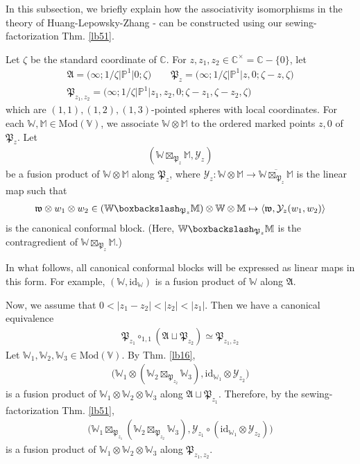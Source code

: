 \documentclass[11pt,b5paper,notitlepage]{article}
\theoremstyle{definition}
\theoremstyle{plain}
\newcommand{\fk}{\mathfrak}
\newcommand{\mc}{\mathcal}
\newcommand{\ovl}{\overline}
\newcommand{\Vbb}{\mathbb V}
\newcommand{\Wbb}{\mathbb W}
\newcommand{\Mbb}{\mathbb M}
\newcommand{\Cbb}{\mathbb C}
\newcommand{\Pbb}{\mathbb P}
\newcommand{\<}{\left\langle}
\renewcommand{\>}{\right\rangle}
\newcommand{\bk}[1]{\langle {#1}\rangle}
\newcommand{\bbs}{\boxbackslash}
\newcommand{\Mod}{\mathrm{Mod}}
\newcommand{\id}{\mathrm{id}}
\newcommand{\fp}{\mathfrak{P}}
\numberwithin{equation}{section}
\begin{document}
In this subsection, we briefly explain how the associativity isomorphisms in the theory of Huang-Lepowsky-Zhang \cite{HLZ1,HLZ2}-\cite{HLZ8} can be constructed using our sewing-factorization Thm. \ref{lb51}.

Let $\zeta$ be the standard coordinate of $\Cbb$. For $z,z_1,z_2\in\Cbb^\times=\Cbb-\{0\}$, let
\begin{gather*}
\fk A=\big(\infty;1/\zeta\big|\Pbb^1\big|0;\zeta\big)\qquad \fk P_z=\big(\infty;1/\zeta\big|\Pbb^1\big|z,0;\zeta-z,\zeta \big)\\
\fk P_{z_1,z_2}=\big(\infty;1/\zeta\big|\Pbb^1\big|z_1,z_2,0;\zeta-z_1,\zeta-z_2,\zeta \big)
\end{gather*}
which are $(1,1),(1,2),(1,3)$-pointed spheres with local coordinates. For each $\Wbb,\Mbb\in\Mod(\Vbb)$, we associate $\Wbb\otimes\Mbb$ to the ordered marked points $z,0$ of $\fp_z$. Let
\begin{gather*}
(\Wbb\boxtimes_{\fp_z}\Mbb,\mc Y_z)
\end{gather*}
be a  fusion product of $\Wbb\otimes\Mbb$ along $\fp_z$, where $\mc Y_z:\Wbb\otimes\Mbb\rightarrow \ovl{\Wbb\boxtimes_{\fp_z}\Mbb}$ is the linear map such that
\begin{align*}
\fk w\otimes w_1\otimes w_2\in(\Wbb\bbs_{\fp_z}\Mbb)\otimes\Wbb\otimes\Mbb\mapsto \bk{\fk w,\mc Y_z(w_1,w_2)}
\end{align*}
is the canonical conformal block. (Here, $\Wbb\bbs_{\fp_z}\Mbb$ is the contragredient of $\Wbb\boxtimes_{\fp_z}\Mbb$.) 

In what follows, all canonical conformal blocks will be expressed as linear maps in this form. For example, $(\Wbb,\id_\Wbb)$ is a  fusion product of $\Wbb$ along $\fk A$.


Now, we assume that $0<|z_1-z_2|<|z_2|<|z_1|$. Then we have a canonical equivalence
\begin{align*}
\fp_{z_1}\circ_{1,1} (\fk A\sqcup\fp_{z_2})\simeq \fp_{z_1,z_2}
\end{align*}
Let $\Wbb_1,\Wbb_2,\Wbb_3\in\Mod(\Vbb)$. By Thm. \ref{lb16},
\begin{gather*}
\big(\Wbb_1\otimes(\Wbb_2\boxtimes_{\fp_{z_2}}\Wbb_3),\id_{\Wbb_1}\otimes\mc Y_{z_2} \big)
\end{gather*}
is a  fusion product of $\Wbb_1\otimes\Wbb_2\otimes\Wbb_3$ along $\fk A\sqcup\fp_{z_1}$. Therefore, by the sewing-factorization Thm. \ref{lb51},
\begin{align*}
\big(\Wbb_1\boxtimes_{\fp_{z_1}}(\Wbb_2\boxtimes_{\fp_{z_2}}\Wbb_3),\mc Y_{z_1}\circ(\id_{\Wbb_1}\otimes\mc Y_{z_2}) \big)
\end{align*}
is a  fusion product of $\Wbb_1\otimes\Wbb_2\otimes\Wbb_3$ along $\fp_{z_1,z_2}$. 
\end{document}
